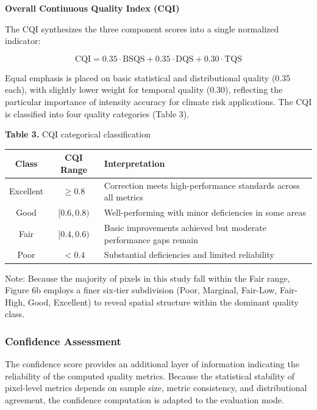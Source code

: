 \documentclass[11pt,a4paper]{article}
\begin{document}
\textbf{Overall Continuous Quality Index (CQI)}

The CQI synthesizes the three component scores into a single normalized
indicator:

\begin{equation}\text{CQI} = 0.35 \cdot \text{BSQS} + 0.35 \cdot \text{DQS} + 0.30 \cdot \text{TQS}\end{equation}

Equal emphasis is placed on basic statistical and distributional quality
(0.35 each), with slightly lower weight for temporal quality (0.30),
reflecting the particular importance of intensity accuracy for climate
risk applications. The CQI is classified into four quality categories
(Table 3).

\textbf{Table 3.} CQI categorical classification

\begingroup\small
\begin{longtable}[]{@{}ccl@{}}
\toprule
Class & CQI Range & Interpretation \\
\midrule
\endhead
\bottomrule
\endlastfoot
Excellent & \(\geq 0.8\) & Correction meets high-performance standards
across all metrics \\
Good & \([0.6, 0.8)\) & Well-performing with minor deficiencies in some
areas \\
Fair & \([0.4, 0.6)\) & Basic improvements achieved but moderate
performance gaps remain \\
Poor & \(< 0.4\) & Substantial deficiencies and limited reliability \\
\end{longtable}
\endgroup

Note: Because the majority of pixels in this study fall within the Fair
range, Figure 6b employs a finer six-tier subdivision (Poor, Marginal,
Fair-Low, Fair-High, Good, Excellent) to reveal spatial structure within
the dominant quality class.

\subsubsection{Confidence Assessment}\label{confidence-assessment}

The confidence score provides an additional layer of information
indicating the reliability of the computed quality metrics. Because the
statistical stability of pixel-level metrics depends on sample size,
metric consistency, and distributional agreement, the confidence
computation is adapted to the evaluation mode.
\end{document}
